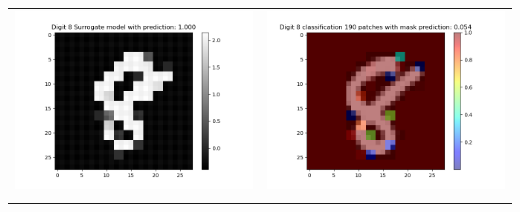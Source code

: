 \documentclass[12pt]{article}
\begin{document}
\begin{table}[H]
\begin{tabular}{|c|c|}
\begin{minipage}{0.45\linewidth}
            \includegraphics[width=\linewidth]{../fig/ID 5-Digit 8 pred 8 new_image.png}
        \end{minipage} &
        \begin{minipage}{0.45\linewidth}
            \centering

            \includegraphics[width=\linewidth]{../fig/ID 5-Digit 8 classification n patches = 190.png}
        \end{minipage} \\
        \\
        \hline
    \end{tabular}
    \label{tab:example}
\end{table}
\end{document}
